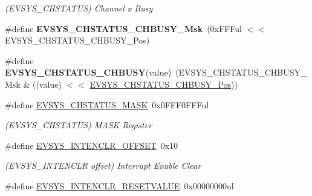 \begin{DoxyCompactItemize}
\begin{DoxyCompactList}\small\item\em (E\+V\+S\+Y\+S\+\_\+\+C\+H\+S\+T\+A\+T\+U\+S) Channel x Busy \end{DoxyCompactList}\item 
\hypertarget{group___s_a_m_l21___e_v_s_y_s_ga7bce985535fe381445bb8a5cf1f2399b}{}\#define {\bfseries E\+V\+S\+Y\+S\+\_\+\+C\+H\+S\+T\+A\+T\+U\+S\+\_\+\+C\+H\+B\+U\+S\+Y\+\_\+\+Msk}~(0x\+F\+F\+Ful $<$$<$ E\+V\+S\+Y\+S\+\_\+\+C\+H\+S\+T\+A\+T\+U\+S\+\_\+\+C\+H\+B\+U\+S\+Y\+\_\+\+Pos)\label{group___s_a_m_l21___e_v_s_y_s_ga7bce985535fe381445bb8a5cf1f2399b}

\item 
\hypertarget{group___s_a_m_l21___e_v_s_y_s_ga1ec9f87254248d2d1b4e567644d57c7f}{}\#define {\bfseries E\+V\+S\+Y\+S\+\_\+\+C\+H\+S\+T\+A\+T\+U\+S\+\_\+\+C\+H\+B\+U\+S\+Y}(value)~(E\+V\+S\+Y\+S\+\_\+\+C\+H\+S\+T\+A\+T\+U\+S\+\_\+\+C\+H\+B\+U\+S\+Y\+\_\+\+Msk \& ((value) $<$$<$ \hyperlink{group___s_a_m_l21___e_v_s_y_s_gaf934c39253522ee2b09adf3b8a61ab8b}{E\+V\+S\+Y\+S\+\_\+\+C\+H\+S\+T\+A\+T\+U\+S\+\_\+\+C\+H\+B\+U\+S\+Y\+\_\+\+Pos}))\label{group___s_a_m_l21___e_v_s_y_s_ga1ec9f87254248d2d1b4e567644d57c7f}

\item 
\hypertarget{group___s_a_m_l21___e_v_s_y_s_ga969f2d9810912d2f07fe47602660dd7f}{}\#define \hyperlink{group___s_a_m_l21___e_v_s_y_s_ga969f2d9810912d2f07fe47602660dd7f}{E\+V\+S\+Y\+S\+\_\+\+C\+H\+S\+T\+A\+T\+U\+S\+\_\+\+M\+A\+S\+K}~0x0\+F\+F\+F0\+F\+F\+Ful\label{group___s_a_m_l21___e_v_s_y_s_ga969f2d9810912d2f07fe47602660dd7f}

\begin{DoxyCompactList}\small\item\em (E\+V\+S\+Y\+S\+\_\+\+C\+H\+S\+T\+A\+T\+U\+S) M\+A\+S\+K Register \end{DoxyCompactList}\item 
\hypertarget{group___s_a_m_l21___e_v_s_y_s_gad616904587ebe8e1c3fb07142e8db5fa}{}\#define \hyperlink{group___s_a_m_l21___e_v_s_y_s_gad616904587ebe8e1c3fb07142e8db5fa}{E\+V\+S\+Y\+S\+\_\+\+I\+N\+T\+E\+N\+C\+L\+R\+\_\+\+O\+F\+F\+S\+E\+T}~0x10\label{group___s_a_m_l21___e_v_s_y_s_gad616904587ebe8e1c3fb07142e8db5fa}

\begin{DoxyCompactList}\small\item\em (E\+V\+S\+Y\+S\+\_\+\+I\+N\+T\+E\+N\+C\+L\+R offset) Interrupt Enable Clear \end{DoxyCompactList}\item 
\hypertarget{group___s_a_m_l21___e_v_s_y_s_gafb4ee0d51bdb48835ff631cb56a93534}{}\#define \hyperlink{group___s_a_m_l21___e_v_s_y_s_gafb4ee0d51bdb48835ff631cb56a93534}{E\+V\+S\+Y\+S\+\_\+\+I\+N\+T\+E\+N\+C\+L\+R\+\_\+\+R\+E\+S\+E\+T\+V\+A\+L\+U\+E}~0x00000000ul\label{group___s_a_m_l21___e_v_s_y_s_gafb4ee0d51bdb48835ff631cb56a93534}


\end{DoxyCompactItemize}
